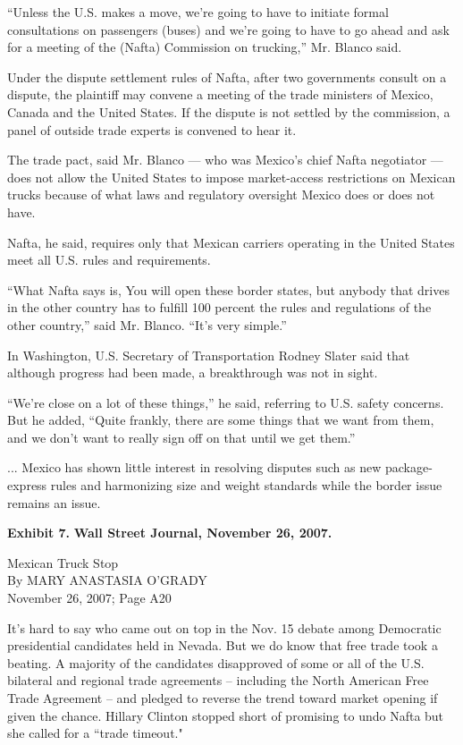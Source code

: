 \documentclass[letterpaper,12pt]{article}
\begin{document}
``Unless the U.S. makes a move, we're going to have to initiate
formal consultations on passengers (buses) and we're going to have
to go ahead and ask for a meeting of the (Nafta) Commission on
trucking,'' Mr. Blanco said.

Under the dispute settlement rules of Nafta, after two governments
consult on a dispute, the plaintiff may convene a meeting of the
trade ministers of Mexico, Canada and the United States. If the
dispute is not settled by the commission, a panel of outside trade
experts is convened to hear it.

The trade pact, said Mr. Blanco --- who was Mexico's chief Nafta
negotiator --- does not allow the United States to impose
market-access restrictions on Mexican trucks because of what laws
and regulatory oversight Mexico does or does not have.

Nafta, he said, requires only that Mexican carriers operating in the
United States meet all U.S. rules and requirements.

``What Nafta says is, You will open these border states, but anybody
that drives in the other country has to fulfill 100 percent the
rules and regulations of the other country,'' said Mr. Blanco.
``It's very simple.''

In Washington, U.S. Secretary of Transportation Rodney Slater said
that although progress had been made, a breakthrough was not in
sight.

``We're close on a lot of these things,'' he said, referring to U.S.
safety concerns. But he added, ``Quite frankly, there are some
things that we want from them, and we don't want to really sign off
on that until we get them.''

... Mexico has shown little interest in resolving disputes such as
new package-express rules and harmonizing size and weight standards
while the border issue remains an issue.

\newpage
{\bf Exhibit 7.} {\bf Wall Street Journal, November 26, 2007.}

Mexican Truck Stop \\
By MARY ANASTASIA O'GRADY \\
November 26, 2007; Page A20

It's hard to say who came out on top in the Nov. 15 debate among 
Democratic presidential candidates held in Nevada. But we do know 
that free trade took a beating. A majority of the candidates 
disapproved of some or all of the U.S. bilateral and regional trade 
agreements -- including the North American Free Trade Agreement -- 
and pledged to reverse the trend toward market opening if given the 
chance. Hillary Clinton stopped short of promising to undo Nafta but 
she called for a ``trade timeout."
\end{document}
